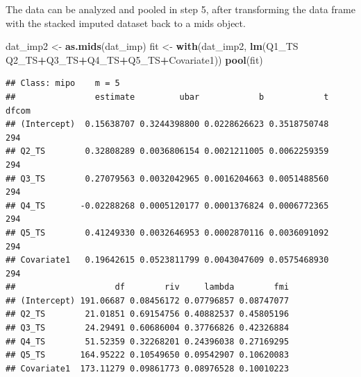 \documentclass[]{book}
\newenvironment{Shaded}{\begin{snugshade}}{\end{snugshade}}
\newcommand{\KeywordTok}[1]{\textcolor[rgb]{0.13,0.29,0.53}{\textbf{#1}}}
\newcommand{\DataTypeTok}[1]{\textcolor[rgb]{0.13,0.29,0.53}{#1}}
\newcommand{\StringTok}[1]{\textcolor[rgb]{0.31,0.60,0.02}{#1}}
\newcommand{\OtherTok}[1]{\textcolor[rgb]{0.56,0.35,0.01}{#1}}
\newcommand{\OperatorTok}[1]{\textcolor[rgb]{0.81,0.36,0.00}{\textbf{#1}}}
\newcommand{\NormalTok}[1]{#1}
\begin{document}
\begin{Shaded}
\end{Shaded}

The data can be analyzed and pooled in step 5, after transforming the
data frame with the stacked imputed dataset back to a mids object.

\begin{Shaded}
\begin{Highlighting}[]
\NormalTok{dat_imp2 <-}\StringTok{ }\KeywordTok{as.mids}\NormalTok{(dat_imp)}
\NormalTok{fit <-}\StringTok{ }\KeywordTok{with}\NormalTok{(dat_imp2, }\KeywordTok{lm}\NormalTok{(Q1_TS}\OperatorTok{~}\StringTok{ }\NormalTok{Q2_TS}\OperatorTok{+}\NormalTok{Q3_TS}\OperatorTok{+}\NormalTok{Q4_TS}\OperatorTok{+}\NormalTok{Q5_TS}\OperatorTok{+}\NormalTok{Covariate1))}
\KeywordTok{pool}\NormalTok{(fit)}
\end{Highlighting}
\end{Shaded}

\begin{verbatim}
## Class: mipo    m = 5 
##                estimate         ubar            b            t dfcom
## (Intercept)  0.15638707 0.3244398800 0.0228626623 0.3518750748   294
## Q2_TS        0.32808289 0.0036806154 0.0021211005 0.0062259359   294
## Q3_TS        0.27079563 0.0032042965 0.0016204663 0.0051488560   294
## Q4_TS       -0.02288268 0.0005120177 0.0001376824 0.0006772365   294
## Q5_TS        0.41249330 0.0032646953 0.0002870116 0.0036091092   294
## Covariate1   0.19642615 0.0523811799 0.0043047609 0.0575468930   294
##                    df        riv     lambda        fmi
## (Intercept) 191.06687 0.08456172 0.07796857 0.08747077
## Q2_TS        21.01851 0.69154756 0.40882537 0.45805196
## Q3_TS        24.29491 0.60686004 0.37766826 0.42326884
## Q4_TS        51.52359 0.32268201 0.24396038 0.27169295
## Q5_TS       164.95222 0.10549650 0.09542907 0.10620083
## Covariate1  173.11279 0.09861773 0.08976528 0.10010223
\end{verbatim}
\end{document}
